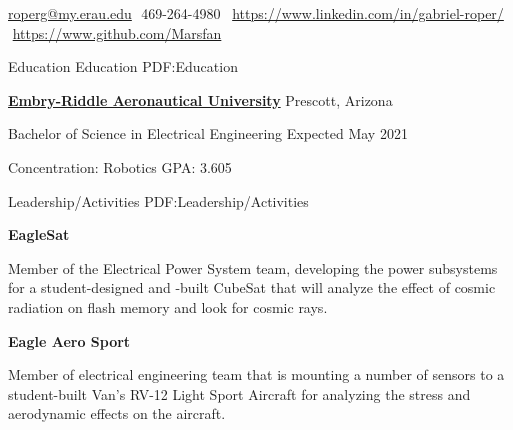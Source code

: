\documentclass[letterpaper,ddMMMyyyy,nonstopmode]{simpleresumecv}
\makeatletter
\newcommand{\CVAuthor}{Gabriel Roper}
\newcommand{\LinkedInPage}{https://www.linkedin.com/in/gabriel-roper/}
\newcommand{\GithubPage}{https://www.github.com/Marsfan}
\newcommand{\emailAddress}{roperg@my.erau.edu}
\newcommand{\streetAddress}{}
\newcommand{\phoneNumber}{469-264-4980}
\newcommand{\descriptionWidth}{33em}
\newenvironment{Description}
{%
	\SmallGap
	\par
	\begin{Detail}
		\Item
		\begin{minipage}{\descriptionWidth}
}
{\par
\end{minipage}
\end{Detail}
}
\makeatother
\begin{document}
	\Title{\CVAuthor}

	\begin{SubTitle}
		{\streetAddress}
		\par
		\href{mailto:\emailAddress}{\emailAddress}
		\BulletSymbol
		\,\,\phoneNumber\,
		\BulletSymbol
		\,\,\href{\LinkedInPage}{\url{\LinkedInPage}}
		\BulletSymbol
		\,\,\href{\GithubPage}{\url{\GithubPage}}
	\end{SubTitle}

	\begin{Body}


		\Section
		{Education}
		{Education}
		{PDF:Education}

		\Entry
		\href{https://prescott.erau.edu}{\textbf{Embry-Riddle Aeronautical University}}
		\hfill Prescott, Arizona

		Bachelor of Science in Electrical Engineering
		\hfill Expected May 2021

		Concentration: Robotics
		\hfill GPA: 3.605


		 {Leadership/Activities} {PDF:Leadership/Activities}

		\Entry


		\Entry
		\textbf{EagleSat}
		\hfill

		\begin{Description}
				Member of the Electrical Power System team, developing the power subsystems for a student-designed and -built CubeSat that will analyze the effect of cosmic radiation on flash memory and look for cosmic rays.
		\end{Description}
		\Gap

		\Entry
		\textbf{Eagle Aero Sport}
		\hfill

		\begin{Description}
				Member of electrical engineering team that is mounting a number of sensors to a student-built Van's RV-12 Light Sport Aircraft for analyzing the stress and aerodynamic effects on the aircraft.
		\end{Description}
		\Gap



\end{Body}
\end{document}
